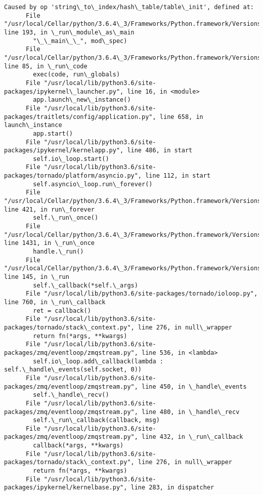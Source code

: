 \documentclass[11pt]{article}
\begin{document}
\begin{Verbatim}[commandchars=\\\{\}]
    Caused by op 'string\_to\_index/hash\_table/table\_init', defined at:
      File "/usr/local/Cellar/python/3.6.4\_3/Frameworks/Python.framework/Versions/3.6/lib/python3.6/runpy.py", line 193, in \_run\_module\_as\_main
        "\_\_main\_\_", mod\_spec)
      File "/usr/local/Cellar/python/3.6.4\_3/Frameworks/Python.framework/Versions/3.6/lib/python3.6/runpy.py", line 85, in \_run\_code
        exec(code, run\_globals)
      File "/usr/local/lib/python3.6/site-packages/ipykernel\_launcher.py", line 16, in <module>
        app.launch\_new\_instance()
      File "/usr/local/lib/python3.6/site-packages/traitlets/config/application.py", line 658, in launch\_instance
        app.start()
      File "/usr/local/lib/python3.6/site-packages/ipykernel/kernelapp.py", line 486, in start
        self.io\_loop.start()
      File "/usr/local/lib/python3.6/site-packages/tornado/platform/asyncio.py", line 112, in start
        self.asyncio\_loop.run\_forever()
      File "/usr/local/Cellar/python/3.6.4\_3/Frameworks/Python.framework/Versions/3.6/lib/python3.6/asyncio/base\_events.py", line 421, in run\_forever
        self.\_run\_once()
      File "/usr/local/Cellar/python/3.6.4\_3/Frameworks/Python.framework/Versions/3.6/lib/python3.6/asyncio/base\_events.py", line 1431, in \_run\_once
        handle.\_run()
      File "/usr/local/Cellar/python/3.6.4\_3/Frameworks/Python.framework/Versions/3.6/lib/python3.6/asyncio/events.py", line 145, in \_run
        self.\_callback(*self.\_args)
      File "/usr/local/lib/python3.6/site-packages/tornado/ioloop.py", line 760, in \_run\_callback
        ret = callback()
      File "/usr/local/lib/python3.6/site-packages/tornado/stack\_context.py", line 276, in null\_wrapper
        return fn(*args, **kwargs)
      File "/usr/local/lib/python3.6/site-packages/zmq/eventloop/zmqstream.py", line 536, in <lambda>
        self.io\_loop.add\_callback(lambda : self.\_handle\_events(self.socket, 0))
      File "/usr/local/lib/python3.6/site-packages/zmq/eventloop/zmqstream.py", line 450, in \_handle\_events
        self.\_handle\_recv()
      File "/usr/local/lib/python3.6/site-packages/zmq/eventloop/zmqstream.py", line 480, in \_handle\_recv
        self.\_run\_callback(callback, msg)
      File "/usr/local/lib/python3.6/site-packages/zmq/eventloop/zmqstream.py", line 432, in \_run\_callback
        callback(*args, **kwargs)
      File "/usr/local/lib/python3.6/site-packages/tornado/stack\_context.py", line 276, in null\_wrapper
        return fn(*args, **kwargs)
      File "/usr/local/lib/python3.6/site-packages/ipykernel/kernelbase.py", line 283, in dispatcher

\end{Verbatim}
\end{document}
